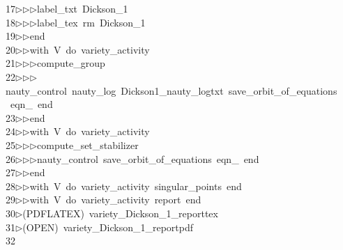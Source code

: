\begin{tabbing}
17\>$\triangleright$\>$\triangleright$\>$\triangleright$\>label\_txt\ Dickson\_1\ \\[0pt]
18\>$\triangleright$\>$\triangleright$\>$\triangleright$\>label\_tex\ rm\ Dickson\_1\ \\[0pt]
19\>$\triangleright$\>$\triangleright$\>end\ \\[0pt]
20\>$\triangleright$\>$\triangleright$\>with\ V\ do\ variety\_activity\ \\[0pt]
21\>$\triangleright$\>$\triangleright$\>$\triangleright$\>compute\_group\ \\[0pt]
22\>$\triangleright$\>$\triangleright$\>$\triangleright$\>nauty\_control\ nauty\_log\ Dickson1\_nauty\_logtxt\ save\_orbit\_of\_equations\\[0pt]
\>\ eqn\_\ end\ \\[0pt]
23\>$\triangleright$\>$\triangleright$\>end\ \\[0pt]
24\>$\triangleright$\>$\triangleright$\>with\ V\ do\ variety\_activity\ \\[0pt]
25\>$\triangleright$\>$\triangleright$\>$\triangleright$\>compute\_set\_stabilizer\ \\[0pt]
26\>$\triangleright$\>$\triangleright$\>$\triangleright$\>nauty\_control\ save\_orbit\_of\_equations\ eqn\_\ end\ \\[0pt]
27\>$\triangleright$\>$\triangleright$\>end\ \\[0pt]
28\>$\triangleright$\>$\triangleright$\>with\ V\ do\ variety\_activity\ singular\_points\ end\ \\[0pt]
29\>$\triangleright$\>$\triangleright$\>with\ V\ do\ variety\_activity\ report\ end\\[0pt]
30\>$\triangleright$\>(PDFLATEX)\ variety\_Dickson\_1\_reporttex\\[0pt]
31\>$\triangleright$\>(OPEN)\ variety\_Dickson\_1\_reportpdf\\[0pt]
32\>\end{tabbing}

